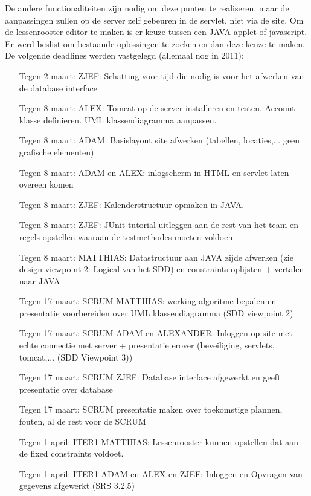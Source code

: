 \documentclass{article}
\begin{document}
De andere functionaliteiten zijn nodig om deze punten te realiseren, maar de aanpassingen zullen op de server zelf gebeuren in de servlet, niet via de site.
Om de lessenrooster editor te maken is er keuze tussen een JAVA applet of javascript. Er werd beslist om bestaande oplossingen te zoeken en dan deze keuze te maken. \\

De volgende deadlines werden vastgelegd (allemaal nog in 2011): \\


\begin{itemize}
	\item[Tegen 2 maart:] ZJEF: Schatting voor tijd die nodig is voor het afwerken van de database interface 
	\item[Tegen 8 maart:] ALEX: Tomcat op de server installeren en testen. Account klasse definieren. UML klassendiagramma aanpassen. 
	\item[Tegen 8 maart:] ADAM: Basislayout site afwerken (tabellen, locaties,... geen grafische elementen)  
	\item[Tegen 8 maart:] ADAM en ALEX: inlogscherm in HTML en servlet laten overeen komen 
	\item[Tegen 8 maart:] ZJEF: Kalenderstructuur opmaken in JAVA.
	\item[Tegen 8 maart:] ZJEF: JUnit tutorial uitleggen aan de rest van het team en regels opstellen waaraan de testmethodes moeten voldoen 
	\item[Tegen 8 maart:] MATTHIAS: Datastructuur aan JAVA zijde afwerken (zie design viewpoint 2: Logical van het SDD) en constraints oplijsten + vertalen naar JAVA 
	\item[Tegen 17 maart:] SCRUM MATTHIAS: werking algoritme bepalen en presentatie voorbereiden over UML klassendiagramma (SDD viewpoint 2) 
	\item[Tegen 17 maart:] SCRUM ADAM en ALEXANDER: Inloggen op site met echte connectie met server + presentatie erover (beveiliging, servlets, tomcat,... (SDD Viewpoint 3)) 
	\item[Tegen 17 maart:] SCRUM ZJEF: Database interface afgewerkt en geeft presentatie over database 
	\item[Tegen 17 maart:] SCRUM presentatie maken over toekomstige plannen, fouten, al de rest voor de SCRUM 
	\item[Tegen 1 april:]  ITER1 MATTHIAS: Lessenrooster kunnen opstellen dat aan de fixed constraints voldoet. 
	\item[Tegen 1 april:] ITER1 ADAM en ALEX en ZJEF: Inloggen en Opvragen van gegevens afgewerkt (SRS 3.2.5) 
\end{itemize}
\end{document}
